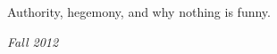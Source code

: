 Authority, hegemony, and why nothing is funny.

\begin{flushright}
\textit{Fall 2012}
\end{flushright}





\groupendnotes

